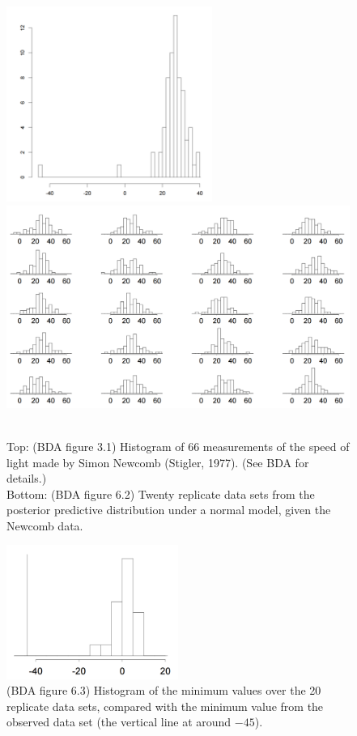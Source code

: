 \documentclass[12pt]{article}
\begin{document}
\begin{figure}
\begin{center}
\includegraphics[width=0.6\textwidth]{newcomb.png}\\
\includegraphics[width=1.0\textwidth]{newcomb-rep.png}
\end{center}
\caption{\\Top: (BDA figure 3.1) Histogram of 66 measurements of the speed of light made by Simon Newcomb (Stigler, 1977). (See BDA for details.)\\
Bottom: (BDA figure 6.2) Twenty replicate data sets from the posterior predictive distribution under a normal model, given the Newcomb data.}
\label{figure:newcomb}
\end{figure}


\begin{figure}
\begin{center}
\includegraphics[width=0.5\textwidth]{newcomb-min.png}
\end{center}
\caption{(BDA figure 6.3) Histogram of the minimum values over the 20 replicate data sets, compared with the minimum value from the observed data set (the vertical line at around $-45$).}
\label{figure:newcomb-min}
\end{figure}
\end{document}
